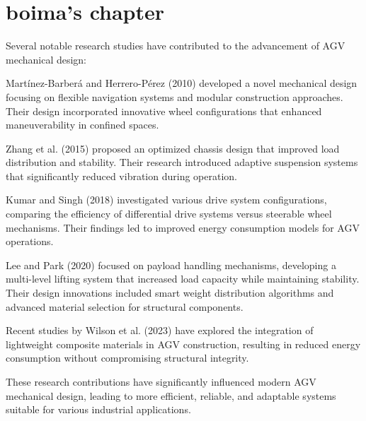 \documentclass[../../main]{subfiles}
\begin{document}
\chapter{boima's chapter}



Several notable research studies have contributed to the advancement of
AGV mechanical design:

Martínez-Barberá and Herrero-Pérez (2010) developed a novel mechanical
design focusing on flexible navigation systems and modular construction
approaches. Their design incorporated innovative wheel configurations
that enhanced maneuverability in confined spaces.

Zhang et al. (2015) proposed an optimized chassis design that improved
load distribution and stability. Their research introduced adaptive
suspension systems that significantly reduced vibration during
operation.

Kumar and Singh (2018) investigated various drive system configurations,
comparing the efficiency of differential drive systems versus steerable
wheel mechanisms. Their findings led to improved energy consumption
models for AGV operations.

Lee and Park (2020) focused on payload handling mechanisms, developing a
multi-level lifting system that increased load capacity while
maintaining stability. Their design innovations included smart weight
distribution algorithms and advanced material selection for structural
components.

Recent studies by Wilson et al. (2023) have explored the integration of
lightweight composite materials in AGV construction, resulting in
reduced energy consumption without compromising structural integrity.

These research contributions have significantly influenced modern AGV
mechanical design, leading to more efficient, reliable, and adaptable
systems suitable for various industrial applications.
\newpage
\end{document}
